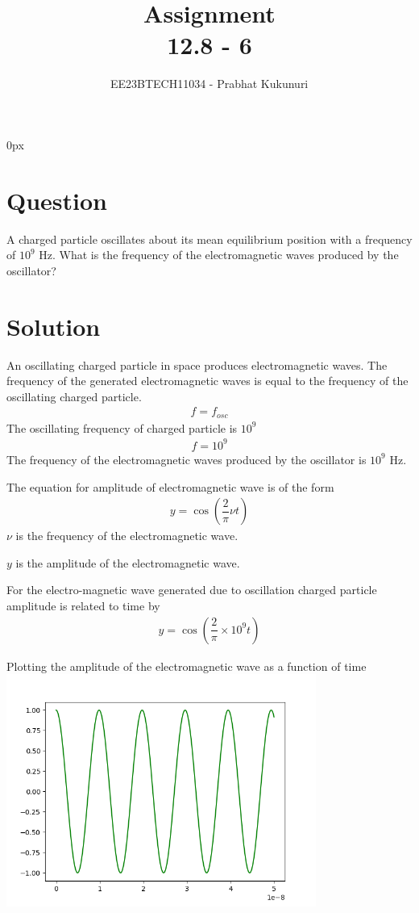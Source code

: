 \documentclass[journal,12pt,twocolumn]{IEEEtran}
\theoremstyle{remark}
\begin{document}
\parindent 0px

\vspace{3cm}

\title{Assignment\\[1ex]12.8 - 6}
\author{EE23BTECH11034 - Prabhat Kukunuri$^{}$%
}
\maketitle
\newpage
\bigskip

\renewcommand{\thefigure}{\theenumi}
\renewcommand{\thetable}{\theenumi}
\section*{Question}
A charged particle oscillates about its mean equilibrium position with a frequency of $10^9$ Hz. What is the frequency of the electromagnetic waves produced by the oscillator?

\section*{Solution}
An oscillating charged particle in space produces electromagnetic waves. The frequency of the generated electromagnetic waves is equal to the frequency of the oscillating charged particle.
\begin{align}
    f = f_{osc}
\end{align}
The oscillating frequency of charged particle is $10^9$
\begin{align}
    f = 10^9
\end{align}
The frequency of the electromagnetic waves produced by the oscillator is $10^9$ Hz.
\vspace{0.2in}

The equation for amplitude of electromagnetic wave is of the form 
\begin{align}
    y = \cos\left({\dfrac{2}{\pi}\nu t}\right)
\end{align}
\hspace{0.25in}
$\nu$ is the frequency of the electromagnetic wave.

\hspace{0.25in}
$y$ is the amplitude of the electromagnetic wave.
\vspace{0.2in}

For the electro-magnetic wave generated due to oscillation charged particle amplitude is related to time by
\begin{align}
    y = \cos\left({\dfrac{2}{\pi}\times 10^9 t}\right)
\end{align}
\vspace{0.2in}

Plotting the amplitude of the electromagnetic wave as a function of time
\includegraphics[width=4in,height=3in]{Figure_1.png}
\end{document}
